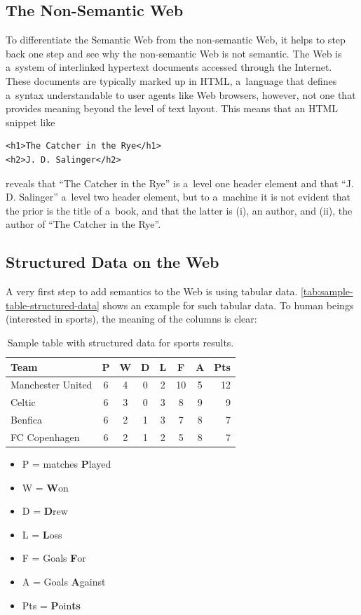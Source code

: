 \subsection{The Non-Semantic Web}
To differentiate the Semantic Web from the non-semantic Web, it helps to step back one step and
see why the non-semantic Web is not semantic.
The Web is a~system of interlinked hypertext documents accessed through the Internet.
These documents are typically marked up in HTML, a~language that defines a~syntax
understandable to user agents like Web browsers, however,
not one that provides meaning beyond the level of text layout.
This means that an HTML snippet like
\begin{verbatim}
<h1>The Catcher in the Rye</h1>
<h2>J. D. Salinger</h2>
\end{verbatim}
reveals that ``The Catcher in the Rye'' is a~level one header element and
that ``J. D. Salinger'' a~level two header element,
but to a~machine it is not evident that the prior is the title of a~book,
and that the latter is (i), an author, and (ii), the author of ``The Catcher in the Rye''.

\subsection{Structured Data on the Web}
A very first step to add semantics to the Web is using tabular data.
\autoref{tab:sample-table-structured-data} shows an example for such tabular data.
To human beings (interested in sports), the meaning of the columns is clear:

\begin{table}[b]
 \begin{center}
  \begin{tabular}{l*{6}{c}r}
Team              & P & W & D & L & F  & A & Pts \\
\hline
Manchester United & 6 & 4 & 0 & 2 & 10 & 5 & 12  \\
Celtic            & 6 & 3 & 0 & 3 &  8 & 9 &  9  \\
Benfica           & 6 & 2 & 1 & 3 &  7 & 8 &  7  \\
FC Copenhagen     & 6 & 2 & 1 & 2 &  5 & 8 &  7  \\
  \end{tabular}
\caption{Sample table with structured data for sports results.}
\label{tab:sample-table-structured-data}
 \end{center}
\end{table}

\begin{itemize}
\item P = matches \textbf{P}layed
\item W = \textbf{W}on 
\item D = \textbf{D}rew
\item L = \textbf{L}oss
\item F = Goals \textbf{F}or
\item A = Goals \textbf{A}gainst
\item Pts = \textbf{P}oin\textbf{ts}
\end{itemize}

